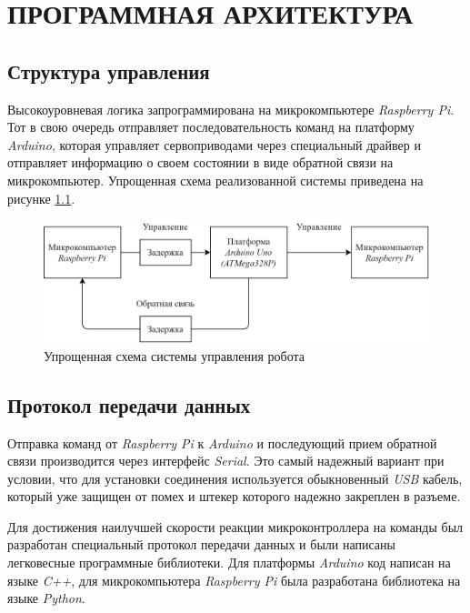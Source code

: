 \chapter{\MakeUppercase{Программная архитектура}} \label{chap:arch}
\section{Структура управления}

Высокоуровневая логика запрограммирована на микрокомпьютере \textit{Raspberry Pi}. Тот в свою очередь отправляет последовательность команд на платформу \textit{Arduino}, которая управляет сервоприводами через специальный драйвер и отправляет информацию о своем состоянии в виде обратной связи на микрокомпьютер. Упрощенная схема реализованной системы приведена на рисунке \ref{fig:upravlenie}.

\begin{figure}[h!]
    \centering
    \includegraphics[width=\textwidth]{chapter_arch/figure2.png}
    \caption{Упрощенная схема системы управления робота}
    \label{fig:upravlenie}
\end{figure}

\section{Протокол передачи данных} \label{sec:protocol}
Отправка команд от \textit{Raspberry Pi} к \textit{Arduino} и последующий прием обратной связи производится через интерфейс \textit{Serial}. Это самый надежный вариант при условии, что для установки соединения используется обыкновенный \textit{USB} кабель, который уже защищен от помех и штекер которого надежно закреплен в разъеме.

Для достижения наилучшей скорости реакции микроконтроллера на команды был разработан специальный протокол передачи данных и были написаны легковесные программные библиотеки. Для платформы \textit{Arduino} код написан на языке \textit{C++}, для микрокомпьютера \textit{Raspberry Pi} была разработана библиотека на языке \textit{Python}.

